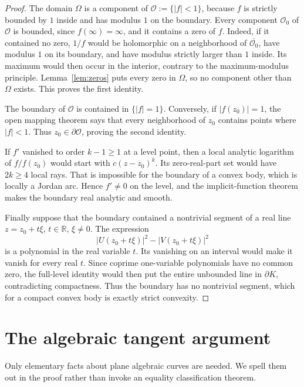 \documentclass[11pt]{article}
\theoremstyle{definition}
\theoremstyle{remark}
\begin{document}
\begin{proof}
The domain \(\Omega\) is a component of
\(\mathcal O:=\{|f|<1\}\), because \(f\) is strictly bounded by \(1\) inside
and has modulus \(1\) on the boundary.  Every component \(\mathcal O_0\) of
\(\mathcal O\) is bounded,
since \(f(\infty)=\infty\), and it contains a zero of \(f\).  Indeed, if it
contained no zero, \(1/f\) would be holomorphic on a neighborhood of
\(\overline{\mathcal O_0}\), have modulus \(1\) on its boundary, and have modulus
strictly larger than \(1\) inside.  Its maximum would then occur in the
interior, contrary to the maximum-modulus principle.  Lemma~\ref{lem:zeros}
puts every zero in \(\Omega\), so no component other than \(\Omega\) exists.
This proves the first identity.

The boundary of \(\mathcal O\) is contained in \(\{|f|=1\}\).  Conversely, if
\(|f(z_0)|=1\), the open mapping theorem says that every neighborhood of
\(z_0\) contains points where \(|f|<1\).  Thus \(z_0\in\partial\mathcal O\), proving
the second identity.

If \(f'\) vanished to order \(k-1\geq1\) at a level point, then a local
analytic logarithm of \(f/f(z_0)\) would start with
\(c(z-z_0)^k\).  Its zero-real-part set would have \(2k\geq4\) local rays.
That is impossible for the boundary of a convex body, which is locally a
Jordan arc.  Hence \(f'\neq0\) on the level, and the implicit-function theorem
makes the boundary real analytic and smooth.

Finally suppose that the boundary contained a nontrivial segment of a real
line \(z=z_0+t\xi\), \(t\in\mathbb R\), \(\xi\neq0\).  The expression
\[
 |U(z_0+t\xi)|^2-|V(z_0+t\xi)|^2
\]
is a polynomial in the real variable \(t\).  Its vanishing on an interval
would make it vanish for every real \(t\).  Since coprime one-variable
polynomials have no common zero, the full-level identity would then put the
entire unbounded line in \(\partial K\), contradicting compactness.  Thus the
boundary has no nontrivial segment, which for a compact convex body is
exactly strict convexity.
\end{proof}

\section{The algebraic tangent argument}

Only elementary facts about plane algebraic curves are needed.  We spell them
out in the proof rather than invoke an equality classification theorem.
\end{document}
